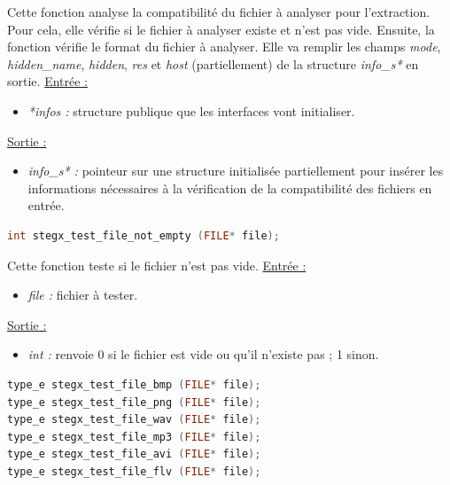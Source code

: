 \documentclass[11pt]{article}
\begin{document}
Cette fonction analyse la compatibilité du fichier à analyser pour l'extraction. 
Pour cela, elle vérifie si le fichier à analyser existe et n'est pas vide. 
Ensuite, la fonction vérifie le format du fichier à analyser. 
Elle va remplir les champs \textit{mode}, \textit{hidden\_name}, \textit{hidden},
\textit{res} et \textit{host} (partiellement) de la structure
\textit{info\_s*} en sortie. 
\newline
\underline{Entrée :}
\begin{itemize}
\item \textit{*infos :} structure publique que les interfaces vont initialiser.
\end{itemize}
\underline{Sortie :}
\begin{itemize}
\item \textit{info\_s* :} pointeur sur une structure initialisée 
partiellement pour insérer les informations nécessaires à la vérification 
de la compatibilité des fichiers en entrée. 
\newline 
\end{itemize}

\begin{lstlisting}[language=c]
int stegx_test_file_not_empty (FILE* file);
\end{lstlisting}

Cette fonction teste si le fichier n'est pas vide. 
\newline
\underline{Entrée :}
\begin{itemize}
\item \textit{file :} fichier à tester.
\end{itemize}
\underline{Sortie :} 
\begin{itemize}
\item \textit{int :} renvoie 0 si le fichier est vide ou qu'il n'existe pas ; 1 sinon. 
\newline \end{itemize}

\begin{lstlisting}[language=c]
type_e stegx_test_file_bmp (FILE* file);
type_e stegx_test_file_png (FILE* file);
type_e stegx_test_file_wav (FILE* file);
type_e stegx_test_file_mp3 (FILE* file);
type_e stegx_test_file_avi (FILE* file);
type_e stegx_test_file_flv (FILE* file);
\end{lstlisting}
\end{document}
